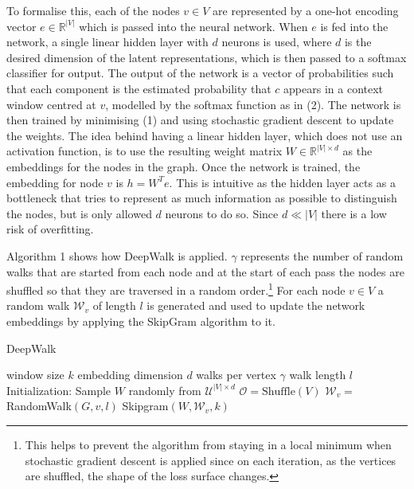 \documentclass[a4paper]{article}
\begin{document}
To formalise this, each of the nodes $v \in V$ are represented by a one-hot
encoding vector $e \in \mathbb{R}^{|V|}$ which is passed into the
neural network. When $e$ is fed into the network, a single linear hidden layer with
$d$ neurons is used, where $d$ is the desired dimension of the latent
representations, which is then passed to a softmax classifier for output. The
output of the network is a vector of probabilities such that each component is the estimated
probability that $c$ appears in a context window centred at $v$, modelled by the softmax function as in (2). The network is then trained by minimising (1) and using stochastic gradient descent to update the weights.
The idea behind having a linear hidden layer, which does not use an activation
function, is to use the resulting weight matrix $W \in \mathbb{R}^{|V| \times
  d}$ as the embeddings for the nodes in the graph. Once the network is trained, the embedding for node $v$ is $h = W^Te$. This is intuitive as
the hidden layer acts as a bottleneck that tries to represent as much
information as possible to distinguish the nodes, but is only allowed $d$
neurons to do so. Since $d \ll |V|$ there is a low risk of overfitting.

Algorithm 1 shows how DeepWalk is applied. $\gamma$ represents the number of
random walks that are started from each node and at the start of each pass the
nodes are shuffled so that they are traversed in a random order.\footnote{This
  helps to prevent the algorithm from staying in a local minimum when stochastic
  gradient descent is applied since on each iteration, as the vertices
  are shuffled, the shape of the loss surface changes.} For each node
$v \in V$ a random walk $\mathcal{W}_v$ of length $l$ is generated and used to
update the network embeddings by applying the SkipGram algorithm to it.

\begin{algorithm}[h!]
  \caption{DeepWalk}
  \begin{algorithmic}[1]
    \Statex window size $k$
    \Statex embedding dimension $d$
    \Statex walks per vertex $\gamma$
    \Statex walk length $l$
    \State Initialization: Sample $W$ randomly from $\mathcal{U}^{|V| \times d}$
    \State $\mathcal{O} = \text{Shuffle}(V)$
    \State $\mathcal{W}_v =$ RandomWalk$(G, v, l)$
    \State Skipgram$(W, \mathcal{W}_v, k)$
    \EndFor
    \EndFor
  \end{algorithmic}
\end{algorithm}
\end{document}

